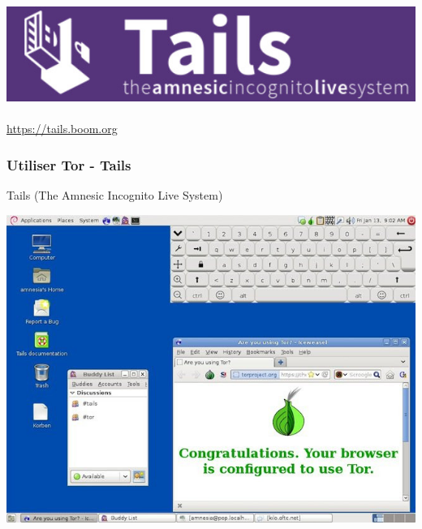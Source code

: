\documentclass{beamer}
\begin{document}
\begin{frame}
\begin{center}
\includegraphics[scale=0.3]{./images/tails_logo.jpg}
\\~\\
\url{https://tails.boom.org}
\end{center}
\end{frame}
\begin{frame}
\frametitle{Utiliser Tor - Tails}

\begin{block}{Tails (The Amnesic Incognito Live System)}
\end{block}
\begin{center}
\includegraphics[scale=0.3]{./images/tails.jpg}

\end{center}
\end{frame}
\end{document}
